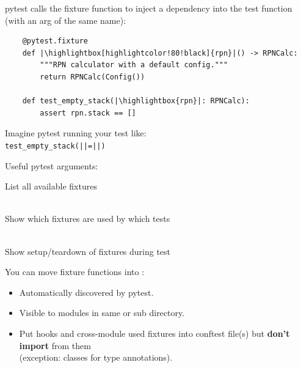 
pytest calls the fixture function to inject a dependency into the test function (with an arg of the same name):
\vspace{-.5em}

\begin{verbatim}
    @pytest.fixture
    def |\highlightbox[highlightcolor!80!black]{rpn}|() -> RPNCalc:
        """RPN calculator with a default config."""
        return RPNCalc(Config())

    def test_empty_stack(|\highlightbox{rpn}|: RPNCalc):
        assert rpn.stack == []
\end{verbatim}

Imagine pytest running your test like: \\[.25em]
{\color{codeblue}\texttt{test_empty_stack(||=||)}}
\vspace{.5em}

Useful pytest arguments:
\vspace{-.5em}

\begin{description}[itemsep=0pt]
    \item[\mono{--fixtures}] List all available fixtures
    \item[\mono{--fixtures-per-test}] \strut\\ Show which fixtures are used by which tests
    \item[\mono{--setup-show}] \strut\\ Show setup/teardown of fixtures during test
\end{description}


You can move fixture functions into :

\begin{itemize}[itemsep=0pt]
    \item Automatically discovered by pytest.
    \item Visible to modules in same or sub directory.
    \item Put hooks and cross-module used fixtures into conftest file(s) but \textbf{don't import} from them \\ (exception: classes for type annotations).
\end{itemize}

